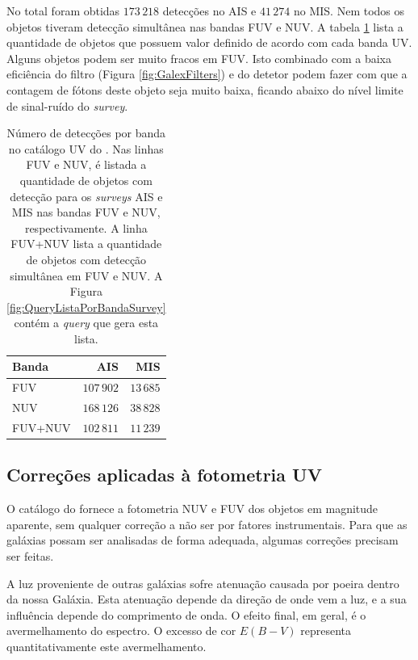 No total foram obtidas $173\,218$ detecções no AIS e $41\,274$ no MIS. Nem todos
os objetos tiveram detecção simultânea nas bandas FUV e NUV. A tabela
\ref{tab:DetBanda} lista a quantidade de objetos que possuem valor definido de
acordo com cada banda UV. Alguns objetos podem ser muito fracos em FUV. Isto
combinado com a baixa eficiência do filtro (Figura \ref{fig:GalexFilters}) e do
detetor podem fazer com que a contagem de fótons deste objeto seja muito baixa,
ficando abaixo do nível limite de sinal-ruído do {\em survey}.

\begin{table}
	\caption[Número de detecções por banda no catálogo UV do \STARLIGHT.]
	{Número de detecções por banda no catálogo UV do \starlight. Nas linhas FUV e
	NUV, é listada a quantidade de objetos com detecção para os {\em
	surveys} AIS e MIS nas bandas FUV e NUV, respectivamente. A linha FUV+NUV
	lista a quantidade de objetos com detecção simultânea em FUV e NUV. A Figura
	\ref{fig:QueryListaPorBandaSurvey} contém a {\em query} que gera esta lista.}
	\setlength{\tabcolsep}{1cm}
	\begin{tabular}{l r r}
		Banda   &        AIS &       MIS \\
		\midrule
		FUV     & $107\,902$ & $13\,685$ \\
		NUV     & $168\,126$ & $38\,828$ \\
		FUV+NUV & $102\,811$ & $11\,239$ \\
	\end{tabular}
	\label{tab:DetBanda}
\end{table}

\subsection{Correções aplicadas à fotometria UV}
\label{sec:Crossmatch:DefAmostras:Correcoes}

O catálogo do \galex fornece a fotometria NUV e FUV dos objetos em magnitude
aparente, sem qualquer correção a não ser por fatores instrumentais. Para que as
galáxias possam ser analisadas de forma adequada, algumas correções precisam ser
feitas.

A luz proveniente de outras galáxias sofre atenuação causada por poeira dentro
da nossa Galáxia. Esta atenuação depende da direção de onde vem a luz, e a sua
influência depende do comprimento de onda. O efeito final, em geral, é o
avermelhamento do espectro. O excesso de cor $E(B-V)$ representa
quantitativamente este avermelhamento.

